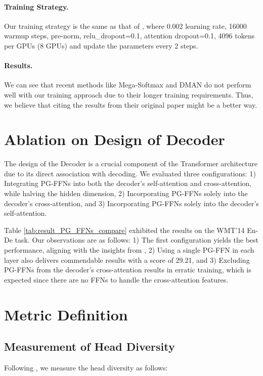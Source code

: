 \documentclass[11pt]{article}
\begin{document}
\paragraph{Training Strategy.} Our training strategy is the same as that of \citet{wang-etal-2019-learning-deep}, where 0.002 learning rate, 16000 warmup steps, pre-norm, relu\_dropout=0.1, attention dropout=0.1, 4096 tokens per GPUs (8 GPUs) and update the parameters every 2 steps.


\paragraph{Results.}
We can see that recent methods like Mega-Softmax and DMAN do not perform well with our training approach due to their longer training requirements. Thus, we believe that citing the results from their original paper might be a better way.



\section{Ablation on Design of Decoder}
\label{sec_compare_decoder}

The design of the Decoder is a crucial component of the Transformer architecture due to its direct association with decoding. We evaluated three configurations: 1) Integrating PG-FFNs into both the decoder's self-attention and cross-attention, while halving the hidden dimension, 2) Incorporating PG-FFNs solely into the decoder's cross-attention, and 3) Incorporating PG-FFNs solely into the decoder's self-attention. 

Table \ref{tab:result_PG_FFNs_compare} exhibited the results on the WMT'14 En-De task. Our observations are as follows: 1) The first configuration yields the best performance, aligning with the insights from \citet{Gulati-etal-2020-conformer, Lu-etal-2020-Macaron}, 2) Using a single PG-FFN in each layer also delivers commendable results with a score of 29.21, and 3) Excluding PG-FFNs from the decoder's cross-attention results in erratic training, which is expected since there are no FFNs to handle the cross-attention features.



\section{Metric Definition}

\subsection{Measurement of Head Diversity}
Following \citet{li-etal-2018-multi-head}, we measure the head diversity as follows:
\end{document}
